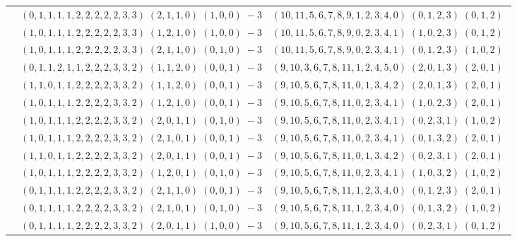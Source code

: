 \documentclass[11pt]{article}
\begin{document}
\begin{longtable}[l]{|c|c|c|}
 \cline{2-3} 
 & $(0 ,1 ,1 ,1 ,1 ,2 ,2 ,2 ,2 ,2 ,3 ,3) \;(2 ,1 ,1 ,0) \;(1 ,0 ,0) \;-3$ & $(10 ,11 ,5 ,6 ,7 ,8 ,9 ,1 ,2 ,3 ,4 ,0) \;(0 ,1 ,2 ,3) \;(0 ,1 ,2) \;$\\ 
 \cline{2-3} 
 & $(1 ,0 ,1 ,1 ,1 ,2 ,2 ,2 ,2 ,2 ,3 ,3) \;(1 ,2 ,1 ,0) \;(1 ,0 ,0) \;-3$ & $(10 ,11 ,5 ,6 ,7 ,8 ,9 ,0 ,2 ,3 ,4 ,1) \;(1 ,0 ,2 ,3) \;(0 ,1 ,2) \;$\\ 
 \cline{2-3} 
 & $(1 ,0 ,1 ,1 ,1 ,2 ,2 ,2 ,2 ,2 ,3 ,3) \;(2 ,1 ,1 ,0) \;(0 ,1 ,0) \;-3$ & $(10 ,11 ,5 ,6 ,7 ,8 ,9 ,0 ,2 ,3 ,4 ,1) \;(0 ,1 ,2 ,3) \;(1 ,0 ,2) \;$\\ 
 \cline{2-3} 
 & $(0 ,1 ,1 ,2 ,1 ,1 ,2 ,2 ,2 ,3 ,3 ,2) \;(1 ,1 ,2 ,0) \;(0 ,0 ,1) \;-3$ & $(9 ,10 ,3 ,6 ,7 ,8 ,11 ,1 ,2 ,4 ,5 ,0) \;(2 ,0 ,1 ,3) \;(2 ,0 ,1) \;$\\ 
 \cline{2-3} 
 & $(1 ,1 ,0 ,1 ,1 ,2 ,2 ,2 ,2 ,3 ,3 ,2) \;(1 ,1 ,2 ,0) \;(0 ,0 ,1) \;-3$ & $(9 ,10 ,5 ,6 ,7 ,8 ,11 ,0 ,1 ,3 ,4 ,2) \;(2 ,0 ,1 ,3) \;(2 ,0 ,1) \;$\\ 
 \cline{2-3} 
 & $(1 ,0 ,1 ,1 ,1 ,2 ,2 ,2 ,2 ,3 ,3 ,2) \;(1 ,2 ,1 ,0) \;(0 ,0 ,1) \;-3$ & $(9 ,10 ,5 ,6 ,7 ,8 ,11 ,0 ,2 ,3 ,4 ,1) \;(1 ,0 ,2 ,3) \;(2 ,0 ,1) \;$\\ 
 \cline{2-3} 
 & $(1 ,0 ,1 ,1 ,1 ,2 ,2 ,2 ,2 ,3 ,3 ,2) \;(2 ,0 ,1 ,1) \;(0 ,1 ,0) \;-3$ & $(9 ,10 ,5 ,6 ,7 ,8 ,11 ,0 ,2 ,3 ,4 ,1) \;(0 ,2 ,3 ,1) \;(1 ,0 ,2) \;$\\ 
 \cline{2-3} 
 & $(1 ,0 ,1 ,1 ,1 ,2 ,2 ,2 ,2 ,3 ,3 ,2) \;(2 ,1 ,0 ,1) \;(0 ,0 ,1) \;-3$ & $(9 ,10 ,5 ,6 ,7 ,8 ,11 ,0 ,2 ,3 ,4 ,1) \;(0 ,1 ,3 ,2) \;(2 ,0 ,1) \;$\\ 
 \cline{2-3} 
 & $(1 ,1 ,0 ,1 ,1 ,2 ,2 ,2 ,2 ,3 ,3 ,2) \;(2 ,0 ,1 ,1) \;(0 ,0 ,1) \;-3$ & $(9 ,10 ,5 ,6 ,7 ,8 ,11 ,0 ,1 ,3 ,4 ,2) \;(0 ,2 ,3 ,1) \;(2 ,0 ,1) \;$\\ 
 \cline{2-3} 
 & $(1 ,0 ,1 ,1 ,1 ,2 ,2 ,2 ,2 ,3 ,3 ,2) \;(1 ,2 ,0 ,1) \;(0 ,1 ,0) \;-3$ & $(9 ,10 ,5 ,6 ,7 ,8 ,11 ,0 ,2 ,3 ,4 ,1) \;(1 ,0 ,3 ,2) \;(1 ,0 ,2) \;$\\ 
 \cline{2-3} 
 & $(0 ,1 ,1 ,1 ,1 ,2 ,2 ,2 ,2 ,3 ,3 ,2) \;(2 ,1 ,1 ,0) \;(0 ,0 ,1) \;-3$ & $(9 ,10 ,5 ,6 ,7 ,8 ,11 ,1 ,2 ,3 ,4 ,0) \;(0 ,1 ,2 ,3) \;(2 ,0 ,1) \;$\\ 
 \cline{2-3} 
 & $(0 ,1 ,1 ,1 ,1 ,2 ,2 ,2 ,2 ,3 ,3 ,2) \;(2 ,1 ,0 ,1) \;(0 ,1 ,0) \;-3$ & $(9 ,10 ,5 ,6 ,7 ,8 ,11 ,1 ,2 ,3 ,4 ,0) \;(0 ,1 ,3 ,2) \;(1 ,0 ,2) \;$\\ 
 \cline{2-3} 
 & $(0 ,1 ,1 ,1 ,1 ,2 ,2 ,2 ,2 ,3 ,3 ,2) \;(2 ,0 ,1 ,1) \;(1 ,0 ,0) \;-3$ & $(9 ,10 ,5 ,6 ,7 ,8 ,11 ,1 ,2 ,3 ,4 ,0) \;(0 ,2 ,3 ,1) \;(0 ,1 ,2) \;$\\ 

\end{longtable}
\end{document}
